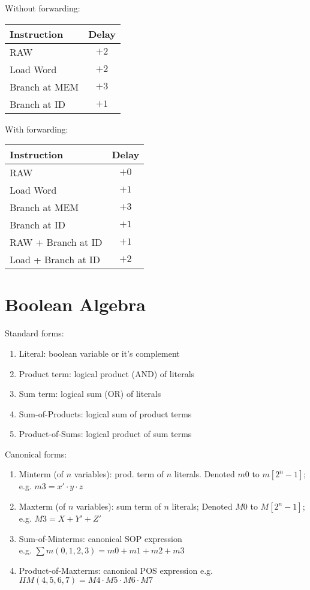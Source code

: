 \documentclass[12pt, a4paper]{article}
\begin{document}
\begin{multicols*}{3}
Without forwarding:
\begin{tabular}{|l|c|}
\hline
\textbf{Instruction} & \textbf{Delay} \\
\hline
RAW & $+2$ \\
Load Word & $+2$ \\
Branch at MEM & $+3$ \\
Branch at ID & $+1$ \\
\hline
\end{tabular}

With forwarding:
\begin{tabular}{|l|c|}
\hline
\textbf{Instruction} & \textbf{Delay} \\
\hline
RAW & $+0$ \\
Load Word & $+1$ \\
Branch at MEM & $+3$ \\
Branch at ID & $+1$ \\
RAW + Branch at ID & $+1$ \\
Load + Branch at ID & $+2$ \\
\hline
\end{tabular}
\vspace{-1em}
\colbreak
\section{Boolean Algebra}

Standard forms:
\begin{enumerate}[\roman*.]
  \item Literal: boolean variable or it's complement
  \item Product term: logical product (AND) of literals
  \item Sum term: logical sum (OR) of literals
  \item Sum-of-Products: logical sum of product terms
  \item Product-of-Sums: logical product of sum terms
\end{enumerate}

Canonical forms:
\begin{enumerate}[\roman*.]
  \item Minterm (of $n$ variables): prod. term of $n$ literals. Denoted $m0$ to $m[2^n-1]$; e.g. $m3  = x'\cdot y\cdot z$
  \item Maxterm (of $n$ variables): sum term of $n$ literals; Denoted $M0$ to $M[2^n-1]$; e.g. $M3 = X+ Y'+ Z'$
  \item Sum-of-Minterms: canonical SOP expression\\
    e.g. $\sum m(0,1,2,3) = m0 + m1 + m2 + m3$
  \item Product-of-Maxterms: canonical POS expression
    e.g. $\Pi M(4,5,6,7) = M4 \cdot M5 \cdot M6 \cdot M7$
\end{enumerate}


\end{multicols*}
\end{document}
